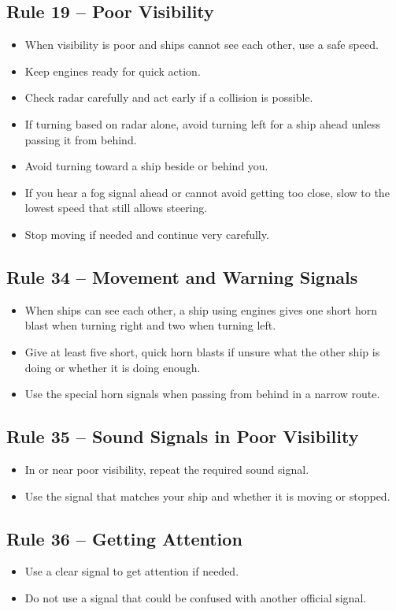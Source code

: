 \documentclass[10pt]{reportMaster}
\begin{document}
\subsection*{Rule 19 -- Poor Visibility}
\begin{itemize}
\item When visibility is poor and ships cannot see each other, use a safe speed.
\item Keep engines ready for quick action.
\item Check radar carefully and act early if a collision is possible.
\item If turning based on radar alone, avoid turning left for a ship ahead unless passing it from behind.
\item Avoid turning toward a ship beside or behind you.
\item If you hear a fog signal ahead or cannot avoid getting too close, slow to the lowest speed that still allows steering.
\item Stop moving if needed and continue very carefully.
\end{itemize}

\subsection*{Rule 34 -- Movement and Warning Signals}
\begin{itemize}
\item When ships can see each other, a ship using engines gives one short horn blast when turning right and two when turning left.
\item Give at least five short, quick horn blasts if unsure what the other ship is doing or whether it is doing enough.
\item Use the special horn signals when passing from behind in a narrow route.
\end{itemize}

\subsection*{Rule 35 -- Sound Signals in Poor Visibility}
\begin{itemize}
\item In or near poor visibility, repeat the required sound signal.
\item Use the signal that matches your ship and whether it is moving or stopped.
\end{itemize}

\subsection*{Rule 36 -- Getting Attention}
\begin{itemize}
\item Use a clear signal to get attention if needed.
\item Do not use a signal that could be confused with another official signal.
\end{itemize}
\end{document}
